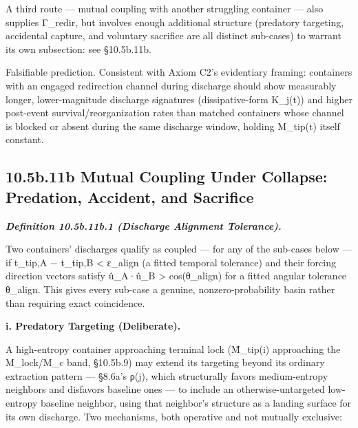 \documentclass[
]{article}
\begin{document}
A third route --- mutual coupling with another struggling container ---
also supplies Γ\_redir, but involves enough additional structure
(predatory targeting, accidental capture, and voluntary sacrifice are
all distinct sub-cases) to warrant its own subsection: see §10.5b.11b.

Falsifiable prediction. Consistent with Axiom C2's evidentiary framing:
containers with an engaged redirection channel during discharge should
show measurably longer, lower-magnitude discharge signatures
(dissipative-form K\_j(t)) and higher post-event survival/reorganization
rates than matched containers whose channel is blocked or absent during
the same discharge window, holding M\_tip(t) itself constant.

\hypertarget{b.11b-mutual-coupling-under-collapse-predation-accident-and-sacrifice}{%
\subsection{10.5b.11b Mutual Coupling Under Collapse: Predation,
Accident, and
Sacrifice}\label{b.11b-mutual-coupling-under-collapse-predation-accident-and-sacrifice}}

\emph{\textbf{Definition 10.5b.11b.1 (Discharge Alignment Tolerance).}}

Two containers' discharges qualify as coupled --- for any of the
sub-cases below --- if \textbar t\_tip,A − t\_tip,B\textbar{}
\textless{} ε\_align (a fitted temporal tolerance) and their forcing
direction vectors satisfy û\_A·û\_B \textgreater{} cos(θ\_align) for a
fitted angular tolerance θ\_align. This gives every sub-case a genuine,
nonzero-probability basin rather than requiring exact coincidence.

\textbf{i. Predatory Targeting (Deliberate).}

A high-entropy container approaching terminal lock (M̃\_tip(i)
approaching the M\_lock/M\_c band, §10.5b.9) may extend its targeting
beyond its ordinary extraction pattern --- §8.6a's ρ(j), which
structurally favors medium-entropy neighbors and disfavors baseline ones
--- to include an otherwise-untargeted low-entropy baseline neighbor,
using that neighbor's structure as a landing surface for its own
discharge. Two mechanisms, both operative and not mutually exclusive:
\end{document}
